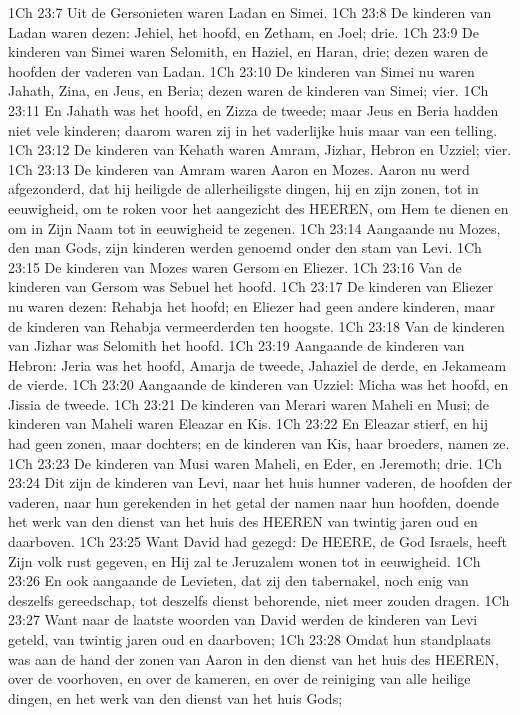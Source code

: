 1Ch 23:7  Uit de Gersonieten waren Ladan en Simei.
1Ch 23:8  De kinderen van Ladan waren dezen: Jehiel, het hoofd, en Zetham, en Joel; drie.
1Ch 23:9  De kinderen van Simei waren Selomith, en Haziel, en Haran, drie; dezen waren de hoofden der vaderen van Ladan.
1Ch 23:10  De kinderen van Simei nu waren Jahath, Zina, en Jeus, en Beria; dezen waren de kinderen van Simei; vier.
1Ch 23:11  En Jahath was het hoofd, en Zizza de tweede; maar Jeus en Beria hadden niet vele kinderen; daarom waren zij in het vaderlijke huis maar van een telling.
1Ch 23:12  De kinderen van Kehath waren Amram, Jizhar, Hebron en Uzziel; vier.
1Ch 23:13  De kinderen van Amram waren Aaron en Mozes. Aaron nu werd afgezonderd, dat hij heiligde de allerheiligste dingen, hij en zijn zonen, tot in eeuwigheid, om te roken voor het aangezicht des HEEREN, om Hem te dienen en om in Zijn Naam tot in eeuwigheid te zegenen.
1Ch 23:14  Aangaande nu Mozes, den man Gods, zijn kinderen werden genoemd onder den stam van Levi.
1Ch 23:15  De kinderen van Mozes waren Gersom en Eliezer.
1Ch 23:16  Van de kinderen van Gersom was Sebuel het hoofd.
1Ch 23:17  De kinderen van Eliezer nu waren dezen: Rehabja het hoofd; en Eliezer had geen andere kinderen, maar de kinderen van Rehabja vermeerderden ten hoogste.
1Ch 23:18  Van de kinderen van Jizhar was Selomith het hoofd.
1Ch 23:19  Aangaande de kinderen van Hebron: Jeria was het hoofd, Amarja de tweede, Jahaziel de derde, en Jekameam de vierde.
1Ch 23:20  Aangaande de kinderen van Uzziel: Micha was het hoofd, en Jissia de tweede.
1Ch 23:21  De kinderen van Merari waren Maheli en Musi; de kinderen van Maheli waren Eleazar en Kis.
1Ch 23:22  En Eleazar stierf, en hij had geen zonen, maar dochters; en de kinderen van Kis, haar broeders, namen ze.
1Ch 23:23  De kinderen van Musi waren Maheli, en Eder, en Jeremoth; drie.
1Ch 23:24  Dit zijn de kinderen van Levi, naar het huis hunner vaderen, de hoofden der vaderen, naar hun gerekenden in het getal der namen naar hun hoofden, doende het werk van den dienst van het huis des HEEREN van twintig jaren oud en daarboven.
1Ch 23:25  Want David had gezegd: De HEERE, de God Israels, heeft Zijn volk rust gegeven, en Hij zal te Jeruzalem wonen tot in eeuwigheid.
1Ch 23:26  En ook aangaande de Levieten, dat zij den tabernakel, noch enig van deszelfs gereedschap, tot deszelfs dienst behorende, niet meer zouden dragen.
1Ch 23:27  Want naar de laatste woorden van David werden de kinderen van Levi geteld, van twintig jaren oud en daarboven;
1Ch 23:28  Omdat hun standplaats was aan de hand der zonen van Aaron in den dienst van het huis des HEEREN, over de voorhoven, en over de kameren, en over de reiniging van alle heilige dingen, en het werk van den dienst van het huis Gods;
